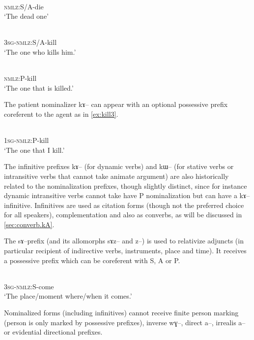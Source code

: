 \documentclass[oldfontcommands,oneside,a4paper,11pt]{article}
\newcommand{\ipa}[1]{{\phon \mbox{#1}}} %
\begin{document}
 \begin{exe}
\ex \label{ex:die}
\gll \ipa{kɯ-si}    \\
  \textsc{nmlz}:S/A-die \\
 \glt  `The dead one'
 
\ex \label{ex:kill}
\gll \ipa{ɯ-kɯ-sat}    \\
  \textsc{3sg}-\textsc{nmlz}:S/A-kill \\
 \glt  `The one who kills him.'
 

\ex \label{ex:kill2}
\gll \ipa{kɤ-sat}    \\
   \textsc{nmlz}:P-kill \\
 \glt  `The one that is killed.'
 \end{exe}
 
  The patient nominalizer \ipa{kɤ--} can appear with an optional possessive prefix coreferent to the agent as in \ref{ex:kill3}.
  \begin{exe}
\ex \label{ex:kill3}
\gll \ipa{a-kɤ-sat}    \\
   \textsc{1sg-nmlz}:P-kill \\
 \glt  `The one that I kill.'
 \end{exe} 
 
The infinitive prefixes  \ipa{kɤ--} (for dynamic verbs) and \ipa{kɯ--} (for stative verbs or intransitive verbs that cannot take animate argument) are also historically related to the nominalization prefixes, though slightly distinct, since for instance dynamic intransitive verbs cannot take have P nominalization but can have a   \ipa{kɤ--} infinitive. Infinitives are used as citation forms (though not the preferred choice for all speakers), complementation and also as converbs, as will be discussed in \ref{sec:converb.kA}.
 
 The \ipa{sɤ}--prefix (and its allomorphs \ipa{sɤz}-- and \ipa{z}--) is used to relativize adjuncts (in particular recipient of indirective verbs, instruments, place and time).  It receives a possessive prefix  which can be coreferent with S, A or P.

   \begin{exe}
\ex \label{ex:come}
\gll \ipa{ɯ-sɤ-ɣi}    \\
   \textsc{3sg-nmlz}:S-come \\
 \glt  `The place/moment where/when it comes.'
 \end{exe}

Nominalized forms (including infinitives) cannot receive finite person marking (person is only marked by possessive prefixes), inverse \ipa{wɣ}--, direct \ipa{a}--, irrealis \ipa{a}-- or evidential directional prefixes.
\end{document}
